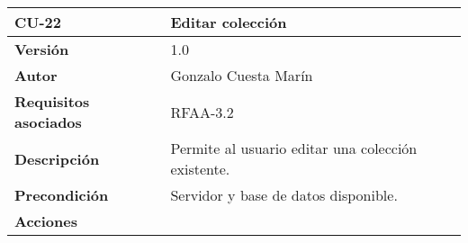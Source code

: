 \begin{longtable}[]{@{}ll@{}}
\toprule
\begin{minipage}[b]{0.19\columnwidth}\raggedright
\textbf{CU-22}\strut
\end{minipage} & \begin{minipage}[b]{0.75\columnwidth}\raggedright
\textbf{Editar colección}\strut
\end{minipage}\tabularnewline
\midrule
\endhead
\begin{minipage}[t]{0.19\columnwidth}\raggedright
\textbf{Versión}\strut
\end{minipage} & \begin{minipage}[t]{0.75\columnwidth}\raggedright
1.0\strut
\end{minipage}\tabularnewline
\begin{minipage}[t]{0.19\columnwidth}\raggedright
\textbf{Autor}\strut
\end{minipage} & \begin{minipage}[t]{0.75\columnwidth}\raggedright
Gonzalo Cuesta Marín\strut
\end{minipage}\tabularnewline
\begin{minipage}[t]{0.19\columnwidth}\raggedright
\textbf{Requisitos asociados}\strut
\end{minipage} & \begin{minipage}[t]{0.75\columnwidth}\raggedright
RFAA-3.2\strut
\end{minipage}\tabularnewline
\begin{minipage}[t]{0.19\columnwidth}\raggedright
\textbf{Descripción}\strut
\end{minipage} & \begin{minipage}[t]{0.75\columnwidth}\raggedright
Permite al usuario editar una colección existente.\strut
\end{minipage}\tabularnewline
\begin{minipage}[t]{0.19\columnwidth}\raggedright
\textbf{Precondición}\strut
\end{minipage} & \begin{minipage}[t]{0.75\columnwidth}\raggedright
Servidor y base de datos disponible.\strut
\end{minipage}\tabularnewline
\begin{minipage}[t]{0.19\columnwidth}\raggedright
\textbf{Acciones}\strut
\end{minipage} & \begin{minipage}[t]{0.75\columnwidth}\raggedright
\begin{enumerate}
\def\labelenumi{\arabic{enumi}.}

\end{enumerate}
\end{minipage}
\end{longtable}
